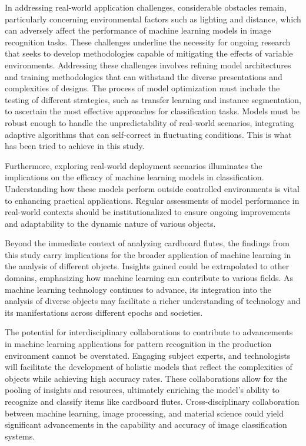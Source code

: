 In addressing real-world application challenges, considerable obstacles remain, particularly concerning environmental factors such as lighting and distance, which can adversely affect the performance of machine learning models in image recognition tasks. These challenges underline the necessity for ongoing research that seeks to develop methodologies capable of mitigating the effects of variable environments. Addressing these challenges involves refining model architectures and training methodologies that can withstand the diverse presentations and complexities of designs. The process of model optimization must include the testing of different strategies, such as transfer learning and instance segmentation, to ascertain the most effective approaches for classification tasks. Models must be robust enough to handle the unpredictability of real-world scenarios, integrating adaptive algorithms that can self-correct in fluctuating conditions. This is what has been tried to achieve in this study.

Furthermore, exploring real-world deployment scenarios illuminates the implications on the efficacy of machine learning models in classification. Understanding how these models perform outside controlled environments is vital to enhancing practical applications. Regular assessments of model performance in real-world contexts should be institutionalized to ensure ongoing improvements and adaptability to the dynamic nature of various objects.

Beyond the immediate context of analyzing cardboard flutes, the findings from this study carry implications for the broader application of machine learning in the analysis of different objects. Insights gained could be extrapolated to other domains, emphasizing how machine learning can contribute to various fields. As machine learning technology continues to advance, its integration into the analysis of diverse objects may facilitate a richer understanding of technology and its manifestations across different epochs and societies.

The potential for interdisciplinary collaborations to contribute to advancements in machine learning applications for pattern recognition in the production environment cannot be overstated. Engaging subject experts, and technologists will facilitate the development of holistic models that reflect the complexities of objects while achieving high accuracy rates. These collaborations allow for the pooling of insights and resources, ultimately enriching the model's ability to recognize and classify items like cardboard flutes. Cross-disciplinary collaboration between machine learning, image processing, and material science could yield significant advancements in the capability and accuracy of image classification systems.

